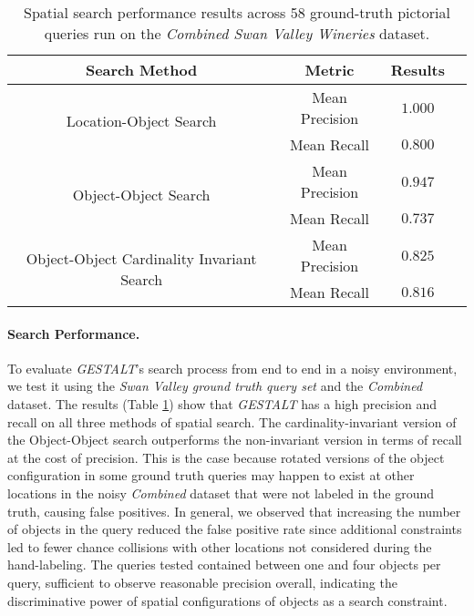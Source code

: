 \small{
\begin{table}[h!]
    \begin{center}
        \begin{tabular}{ |c|c|c|c| } 
            \hline
            Search Method & Metric & Results \\
            \hline
            \multirow{2}{18em}{Location-Object Search} & Mean Precision & $1.000$ \\
            & Mean Recall & $0.800$\\%
            \hline     
            \multirow{2}{18em}{Object-Object Search} & Mean Precision & $0.947$ \\ 
            &Mean Recall & $0.737$ \\
            \hline
            \multirow{2}{18em}{Object-Object Cardinality Invariant Search} & Mean Precision & $0.825$ \\ 
            &Mean Recall & $0.816$ \\
            \hline
        \end{tabular}
        \caption{Spatial search performance results across 58 ground-truth pictorial queries run on the \textit{Combined Swan Valley Wineries} dataset.} %
        \label{Table:GroundTruth}
    \end{center}
    \vspace{-20pt}
\end{table}
}
\normalsize
\paragraph{Search Performance.}

To evaluate \emph{GESTALT}'s search process from end to end in a noisy environment, we test it using the \textit{Swan Valley ground truth query set} and the \textit{Combined} dataset.
The results (Table \ref{Table:GroundTruth}) show that \emph{GESTALT} has a high precision and recall on all three methods of spatial search.
The cardinality-invariant version of the Object-Object search outperforms the non-invariant version in terms of recall at the cost of precision.
This is the case because rotated versions of the object configuration in some ground truth queries may happen to exist at other locations in the noisy \textit{Combined} dataset that were not labeled in the ground truth, causing false positives.
In general, we observed that increasing the number of objects in the query reduced the false positive rate since additional constraints led to fewer chance collisions with other locations not considered during the hand-labeling.
The queries tested contained between one and four objects per query, sufficient to observe reasonable precision overall, indicating the discriminative power of spatial configurations of objects as a search constraint.

